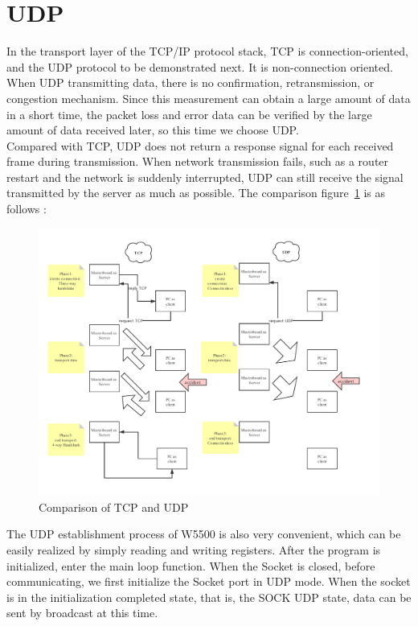 \section{UDP}
\label{sec:UDP}
In the transport layer of the TCP/IP protocol stack, TCP is connection-oriented, and the UDP protocol to be demonstrated next. It is non-connection oriented.
\\
When UDP transmitting data, there is no confirmation, retransmission, or congestion mechanism. Since this measurement can obtain a large amount of data in a short time, the packet loss and error data can be verified by the large amount of data received later, so this time we choose UDP.
\\
Compared with TCP, UDP does not return a response signal for each received frame during transmission. When network transmission fails, such as a router restart and the network is suddenly interrupted, UDP can still receive the signal transmitted by the server as much as possible. The comparison figure~\ref{fig:2.11}  is as follows :
\begin{figure}[!ht]
	\centering
	\includegraphics[scale=0.7]{grafiken/2.11.pdf}
	\caption{Comparison of TCP and UDP} 
	\label{fig:2.11}
\end{figure}
\FloatBarrier
The UDP establishment process of W5500 is also very convenient, which can be easily realized by simply reading and writing registers. After the program is initialized, enter the main loop function. When the Socket is closed, before communicating, we first initialize the Socket port in UDP mode. When the socket is in the initialization completed state, that is, the SOCK UDP state, data can be sent by broadcast at this time.
